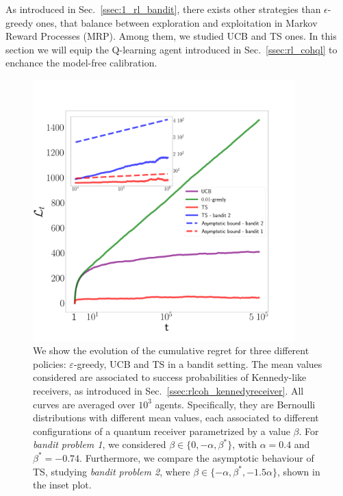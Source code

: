 As introduced in Sec.~\ref{ssec:1_rl_bandit}, there exists other strategies than $\epsilon$-greedy ones, that balance between exploration and exploitation in Markov Reward Processes (MRP). Among them, we studied  UCB and TS ones. In this section we will equip the Q-learning agent introduced in Sec.~\ref{ssec:rl_cohql} to enchance the model-free calibration.

\begin{figure}[t!]
    \centering
    \includegraphics[width=0.9\textwidth]{Figures/1bandit/bandit_numerics_not_shifted.png}
    \caption{We show the evolution of the cumulative regret for three different policies: $\varepsilon$-greedy, UCB and TS in a bandit setting. The mean values considered are associated to success probabilities of Kennedy-like receivers, as introduced in Sec.~\ref{ssec:rlcoh_kennedyreceiver}. All curves are averaged  over $10^{3}$ agents. Specifically, they are Bernoulli distributions with different mean values, each associated to different configurations of a quantum receiver parametrized by a value $\beta$. For \textit{bandit problem 1}, we considered $\beta \in \{0, -\alpha, \beta^{*}\}$, with $\alpha = 0.4$ and $\beta^{*} = -0.74$.
    Furthermore, we compare the asymptotic behaviour of TS, studying \textit{bandit problem 2}, where $\beta \in \{-\alpha, \beta^{*}, -1.5 \alpha\}$, shown in the inset plot.}
    \label{fig:bandfig}
\end{figure}

